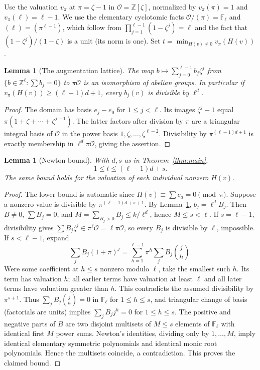 \documentclass[11pt]{article}
\newtheorem{lemma}[theorem]{Lemma}
\theoremstyle{remark}\newtheorem{remark}[theorem]{Remark}
\newcommand{\F}{\mathbb F}
\newcommand{\Z}{\mathbb Z}
\begin{document}
Use the valuation $v_\pi$ at $\pi=\zeta-1$ in $\mathcal O=\Z[\zeta]$, normalized by $v_\pi(\pi)=1$ and $v_\pi(\ell)=\ell-1$. We use the elementary cyclotomic facts $\mathcal O/(\pi)=\F_\ell$ and $(\ell)=(\pi^{\ell-1})$, which follow from $\prod_{j=1}^{\ell-1}(1-\zeta^j)=\ell$ and the fact that $(1-\zeta^j)/(1-\zeta)$ is a unit (its norm is one). Set $t=\min_{H(v)\ne0}v_\pi(H(v))$.

\begin{lemma}[The augmentation lattice]\label{lem:aug}
The map $b\mapsto\sum_{j=0}^{\ell-1}b_j\zeta^j$ from $\{b\in\Z^\ell:\sum b_j=0\}$ to $\pi\mathcal O$ is an isomorphism of abelian groups. In particular if $v_\pi(H(v))\ge (\ell-1)d+1$, every $b_j(v)$ is divisible by $\ell^d$.
\end{lemma}
\begin{proof}
The domain has basis $e_j-e_0$ for $1\le j<\ell$. Its images $\zeta^j-1$ equal $\pi(1+\zeta+\cdots+\zeta^{j-1})$. The latter factors after division by $\pi$ are a triangular integral basis of $\mathcal O$ in the power basis $1,\zeta,\ldots,\zeta^{\ell-2}$. Divisibility by $\pi^{(\ell-1)d+1}$ is exactly membership in $\ell^d\pi\mathcal O$, giving the assertion.
\end{proof}

\begin{lemma}[Newton bound]\label{lem:val}
With $d,s$ as in Theorem~\ref{thm:main},
\begin{equation}\label{eq:valuation}
 1\le t\le (\ell-1)d+s.
\end{equation}
The same bound holds for the valuation of each individual nonzero $H(v)$.
\end{lemma}
\begin{proof}
The lower bound is automatic since $H(v)\equiv\sum c_a=0\pmod\pi$. Suppose a nonzero value is divisible by $\pi^{(\ell-1)d+s+1}$. By Lemma~\ref{lem:aug}, $b_j=\ell^d B_j$. Then $B\ne0$, $\sum B_j=0$, and $M=\sum_{B_j>0}B_j\le k/\ell^d$, hence $M\le s<\ell$. If $s=\ell-1$, divisibility gives $\sum B_j\zeta^j\in\pi^\ell\mathcal O=\ell\pi\mathcal O$, so every $B_j$ is divisible by $\ell$, impossible. If $s<\ell-1$, expand
\[
 \sum_j B_j(1+\pi)^j=\sum_{h=1}^{\ell-1}\pi^h \sum_j B_j\binom jh.
\]
Were some coefficient at $h\le s$ nonzero modulo $\ell$, take the smallest such $h$. Its term has valuation $h$; all earlier terms have valuation at least $\ell$ and all later terms have valuation greater than $h$. This contradicts the assumed divisibility by $\pi^{s+1}$. Thus $\sum_j B_j\binom jh=0$ in $\F_\ell$ for $1\le h\le s$, and triangular change of basis (factorials are units) implies $\sum_j B_j j^h=0$ for $1\le h\le s$. The positive and negative parts of $B$ are two disjoint multisets of $M\le s$ elements of $\F_\ell$ with identical first $M$ power sums. Newton's identities, dividing only by $1,\ldots,M$, imply identical elementary symmetric polynomials and identical monic root polynomials. Hence the multisets coincide, a contradiction. This proves the claimed bound.
\end{proof}
\end{document}

